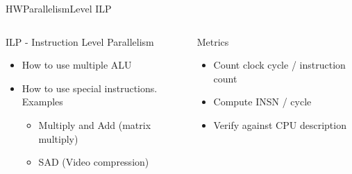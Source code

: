 %
\begin{Frame}{HWParallelismLevel ILP}
  \begin{columns}[t]
    \begin{column}{\HW} %
      \begin{block}{ILP - Instruction Level Parallelism}
        \begin{itemize}
        \item How to use multiple ALU
        \item How to use special instructions. Examples
          \begin{itemize}
          \item Multiply and Add (matrix multiply)
          \item SAD (Video compression)
          \end{itemize}
        \end{itemize}
      \end{block} 
    \end{column}
    
    \begin{column}{\HW} %
      \begin{alertblock}{Metrics}
        \begin{itemize}
        \item Count clock cycle / instruction count
        \item Compute INSN / cycle
        \item Verify against CPU description
        \end{itemize}
      \end{alertblock}   
    \end{column}
  \end{columns}  
\end{Frame}


